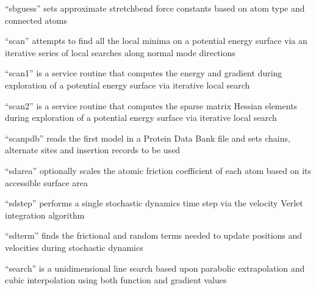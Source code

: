 \documentclass[letterpaper,11pt,english]{sphinxmanual}
\begin{document}

“sbguess” sets approximate stretch\sphinxhyphen{}bend force constants based
on atom type and connected atoms


“scan” attempts to find all the local minima on a potential
energy surface via an iterative series of local searches along
normal mode directions


“scan1” is a service routine that computes the energy and
gradient during exploration of a potential energy surface
via iterative local search


“scan2” is a service routine that computes the sparse matrix
Hessian elements during exploration of a potential energy
surface via iterative local search


“scanpdb” reads the first model in a Protein Data Bank file and
sets chains, alternate sites and insertion records to be used


“sdarea” optionally scales the atomic friction coefficient
of each atom based on its accessible surface area


“sdstep” performs a single stochastic dynamics time step
via the velocity Verlet integration algorithm


“sdterm” finds the frictional and random terms needed to
update positions and velocities during stochastic dynamics


“search” is a unidimensional line search based upon parabolic
extrapolation and cubic interpolation using both function and
gradient values





\end{document}
